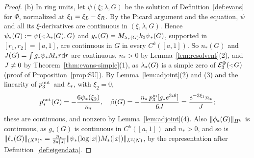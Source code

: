 \begin{proof}
(b) In ring units, let $\psi(\xi;\lambda,G)$ be the solution of
Definition~\ref{def:evans} for $\Phi$, normalized at $\xi_1=\xi_L-\xi_R$. By the
Picard argument and the equation, $\psi$ and all its $\xi$-derivatives are
continuous in $(\xi,\lambda,G)$. Hence $\psi_*(G):=\psi(\cdot;\lambda_*(G),G)$ and
$g_*(G)=M_{\lambda_*(G)}k_3\psi_*(G)$, supported in $[r_1,r_2]=[a,1]$, are
continuous in $G$ in every $C^k([a,1])$. So $n_*(G)$ and
$J(G)=\int g_*\psi_*M_*r\dd r$ are continuous, $n_*>0$ by
Lemma~\ref{lem:resolvent}(2), and $J\ne0$ by Theorem~\ref{thm:evans-simple}(1),
as $\lambda_*(G)$ is a simple zero of $\mathcal{E}^\Phi_3(\cdot;G)$ (proof of
Proposition~\ref{prop:SU}). By
Lemma~\ref{lem:adjoint}(2) and (3) and the linearity of $p^{\mathrm{out}}_3$ and
$\ell_*$, with $\xi_2=0$,
\[
p^{\mathrm{out}}_*(G)=-\frac{6\psi_*(\xi_2)}{n_*},\quad
\beta(G)=-\frac{n_*\,p^{\mathrm{in}}_3[g_*e^{3i\theta}]}{6J}=\frac{e^{-3\xi_1}n_*}{J};
\]
these are continuous, and nonzero by Lemma~\ref{lem:adjoint}(4). Also
$\|\phi_*(G)\|_{H^k}$ is continuous, as $g_*(G)$ is continuous in $C^k([a,1])$ and
$n_*>0$, and so is
$\|\ell_*(G)\|_{(X^0)^*}=\frac{n_*}{2\pi|J|}\|\psi_*(\log|x|)M_*(|x|)\|_{L^2(N)}$,
by the representation after Definition~\ref{def:eigendata}.
\end{proof}

